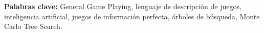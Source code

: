 \vspace{1.5em}


\noindent
\textbf{Palabras clave:}
General Game Playing, lenguaje de descripción de juegos, inteligencia
artificial, juegos de información perfecta, árboles de búsqueda, Monte Carlo
Tree Search.

